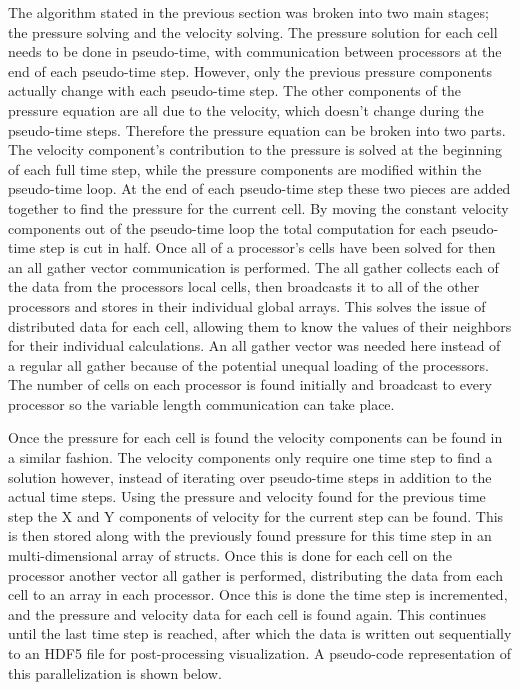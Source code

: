 \documentclass[12pt]{article}
\begin{document}
The algorithm stated in the previous section was broken into two main stages; the pressure solving and the velocity 
solving. The pressure solution for each cell needs to be done in pseudo-time, with communication between processors at 
the end of each pseudo-time step. However, only the previous pressure components actually change with each pseudo-time 
step. The other components of the pressure equation are all due to the velocity, which doesn't change during the 
pseudo-time steps. Therefore the pressure equation can be broken into two parts. The velocity component's contribution 
to the pressure is solved at the beginning of each full time step, while the pressure components are modified within 
the pseudo-time loop. At the end of each pseudo-time step these two pieces are added together to find the pressure for 
the current cell. By moving the constant velocity components out of the pseudo-time loop the total computation for 
each pseudo-time step is cut in half. Once all of a processor's cells have been solved for then an all gather vector 
communication is performed. The all gather collects each of the data from the processors local cells, then broadcasts 
it to all of the other processors and stores in their individual global arrays. This solves the issue of distributed 
data for each cell, allowing them to know the values of their neighbors for their individual calculations. An all 
gather vector was needed here instead of a regular all gather because of the potential unequal loading of the 
processors. The number of cells on each processor is found initially and broadcast to every processor so the 
variable length communication can take place.

Once the pressure for each cell is found the velocity components can be found in a similar fashion. The velocity 
components only require one time step to find a solution however, instead of iterating over pseudo-time steps in 
addition to the actual time steps. Using the pressure and velocity found for the previous time step the X and Y 
components of velocity for the current step can be found. This is then stored along with the previously found pressure 
for this time step in an multi-dimensional array of structs. Once this is done for each cell on the processor another 
vector all gather is performed, distributing the data from each cell to an array in each processor. Once this is done 
the time step is incremented, and the pressure and velocity data for each cell is found again. This continues until 
the last time step is reached, after which the data is written out sequentially to an HDF5 file for post-processing 
visualization. A pseudo-code representation of this parallelization is shown below.
\end{document}
